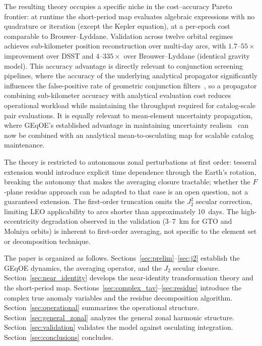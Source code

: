 The resulting theory occupies a specific niche in the cost--accuracy
Pareto frontier: at runtime the short-period map evaluates algebraic
expressions with no quadrature or iteration (except the Kepler equation),
at a per-epoch cost comparable to Brouwer--Lyddane.
Validation across twelve orbital regimes achieves sub-kilometer position
reconstruction over multi-day arcs, with $1.7$--$55\times$ improvement
over DSST and $4$--$335\times$ over Brouwer--Lyddane (identical gravity
model).  This accuracy advantage is directly relevant to conjunction
screening pipelines, where the accuracy of the underlying analytical
propagator significantly influences the false-positive rate of geometric
conjunction filters~\cite{rivero2025,rivero2025b}, so a propagator combining
sub-kilometer accuracy with analytical evaluation cost reduces operational
workload while maintaining the throughput required for catalog-scale pair
evaluations.  It is equally relevant to mean-element uncertainty
propagation, where GEqOE's established advantage in maintaining uncertainty
realism~\cite{hernandoayuso2023} can now be combined with an analytical
mean-to-osculating map for scalable catalog maintenance.

The theory is restricted to autonomous zonal perturbations at first order:
tesseral extension would introduce explicit time dependence through the
Earth's rotation, breaking the autonomy that makes the averaging closure
tractable; whether the $F$-plane residue approach can be adapted to that
case is an open question, not a guaranteed extension.  The first-order
truncation omits the $J_2^2$ secular correction, limiting LEO
applicability to arcs shorter than approximately 10~days.  The
high-eccentricity degradation observed in the validation (3--7~km for GTO
and Molniya orbits) is inherent to first-order averaging, not specific to
the element set or decomposition technique.

The paper is organized as follows.
Sections~\ref{sec:prelim}--\ref{sec:j2} establish the GEqOE dynamics, the
averaging operator, and the $J_2$ secular closure.
Section~\ref{sec:near_identity} develops the near-identity transformation
theory and the short-period map.
Sections~\ref{sec:complex_tav}--\ref{sec:residue} introduce the complex
true anomaly variables and the residue decomposition algorithm.
Section~\ref{sec:operational} summarizes the operational structure.
Section~\ref{sec:general_zonal} analyzes the general zonal harmonic
structure.
Section~\ref{sec:validation} validates the model against osculating
integration.
Section~\ref{sec:conclusions} concludes.
